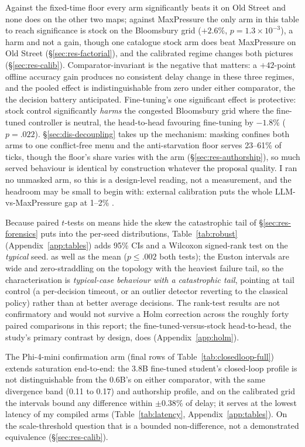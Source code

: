  Against the fixed-time floor
every arm significantly beats it on Old Street and none does on the other
two maps; against MaxPressure the only arm in this table to reach
significance is stock on the Bloomsbury grid ($+2.6\%$,
$p{=}1.3{\times}10^{-3}$), a harm and not a gain, though one catalogue
stock arm does beat MaxPressure on Old Street (\S\ref{sec:res-factorial}),
and the calibrated regime changes both pictures (\S\ref{sec:res-calib}).
Comparator-invariant is the negative that matters: a $+42$-point offline
accuracy gain produces no consistent delay change in these three regimes,
and the pooled effect is indistinguishable from zero under either
comparator, the  the decision battery
anticipated. Fine-tuning's one significant effect is protective: stock
control significantly \emph{harms} the congested Bloomsbury grid where the
fine-tuned controller is neutral, the head-to-head favouring fine-tuning by
$-1.8\%$ ($p{=}.022$). \S\ref{sec:dis-decoupling} takes up the mechanism:
masking confines both arms to one conflict-free menu and the
anti-starvation floor serves 23--61\% of ticks, though the floor's share
varies with the arm (\S\ref{sec:res-authorship}), so much served behaviour
is identical by construction whatever the proposal quality. I ran no
unmasked arm, so this is a design-level reading, not a measurement, and
the headroom may be small to begin with: external calibration puts the
whole LLM-vs-MaxPressure gap at 1--2\% \cite{dglight2026}.

Because paired $t$-tests on means hide the skew the catastrophic tail of
\S\ref{sec:res-forensics} puts into the per-seed distributions,
Table~\ref{tab:robust} (Appendix~\ref{app:tables}) adds 95\% CIs and a
Wilcoxon signed-rank test on the \emph{typical} seed.  as well as the mean ($p\le.002$ both
tests); the Euston intervals are wide and zero-straddling on the topology
with the heaviest failure tail, so the characterisation is
\emph{typical-case behaviour with a catastrophic tail}, pointing at tail
control (a per-decision timeout, or an outlier detector reverting to the
classical policy) rather than at better average decisions. The rank-test
results are not confirmatory and would not survive a Holm correction
across the roughly forty paired comparisons in this report; the
fine-tuned-versus-stock head-to-head, the study's primary contrast by
design, does (Appendix~\ref{app:holm}).

The Phi-4-mini confirmation arm (final rows of
Table~\ref{tab:closedloop-full}) extends saturation end-to-end: the 3.8B
fine-tuned student's closed-loop profile is not distinguishable from the
0.6B's on either comparator, with the same divergence band (0.11 to 0.17)
and authorship profile, and on the calibrated grid the intervals bound any
difference within $\pm0.38\%$ of delay; it serves at the lowest latency of
my compiled arms (Table~\ref{tab:latency}, Appendix~\ref{app:tables}). On
the scale-threshold question that is a bounded non-difference, not a
demonstrated equivalence (\S\ref{sec:res-calib}).
